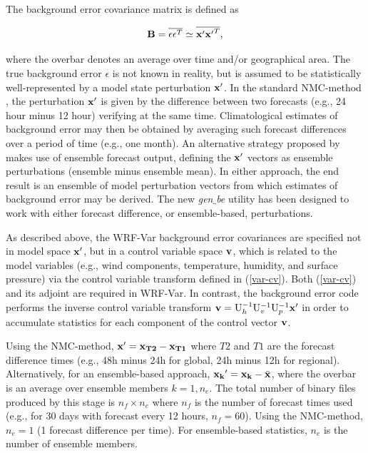 The background error covariance matrix is defined as 

\begin{equation}
{\bf B}=\overline{\epsilon \epsilon^{T}} \simeq \overline{{\bf x'}{\bf x'}^{T}},
\label{var-b}
\end{equation}

\noindent where the overbar denotes an average over time and/or geographical area. The true 
background error $\epsilon$ is not known in reality, but is assumed to be statistically
well-represented by a model state perturbation ${\bf x'}$. In the standard NMC-method
\citep{parrish92}, the perturbation ${\bf x'}$ is given by the difference between 
two forecasts (e.g., 24 hour minus 12 hour) verifying at the same time. Climatological 
estimates of background error may then be obtained by averaging such forecast 
differences over a period of time (e.g., one month). An alternative strategy proposed by 
\citep{fisher03} makes use of ensemble forecast output, defining the ${\bf x'}$ vectors as 
ensemble perturbations (ensemble minus ensemble mean). In either approach, the end 
result is an ensemble of model perturbation vectors from which estimates of 
background error may be derived. The new {\it gen$\_$be} utility has been designed to work with 
either forecast difference, or ensemble-based, perturbations.

As described above, the WRF-Var background error covariances are specified not in 
model space ${\bf x'}$, but in a control variable space ${\bf v}$, which is related to the model variables 
(e.g., wind components, temperature, humidity, and surface pressure) via the control 
variable transform defined in (\ref{var-cv}). Both (\ref{var-cv}) and 
its adjoint are required in WRF-Var. In contrast, the background error code performs the 
inverse control variable transform ${\bf v}={\rm U}_{h}^{-1} {\rm U}_{v}^{-1} {\rm U}_{p}^{-1}{\bf x'}$ in order to 
accumulate statistics for each component of the control vector ${\bf v}$.

Using the NMC-method, ${\bf x}'={\bf x_{T2}}-{\bf x_{T1}}$ where $T2$ and $T1$ 
are the forecast difference times (e.g., 48h minus 24h for global, 24h minus 12h for regional). 
Alternatively, for an ensemble-based approach, ${\bf x_{k}}'={\bf x_{k}}-\bar{\bf 
x}$, where the overbar is an average over ensemble members $k=1,n_{e}$. The total 
number of binary files produced by this stage is $n_{f} \times n_e$ where $n_f$ is the 
number of forecast times used (e.g., for 30 days with forecast every 12 hours, $n_f=60$). 
Using the NMC-method, $n_e=1$ (1 forecast difference per time). For ensemble-based 
statistics, $n_e$ is the number of ensemble members.

